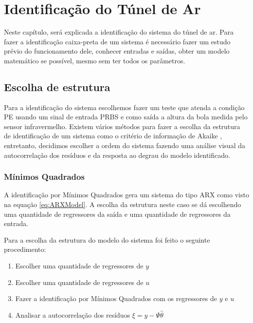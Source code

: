 \chapter{Identificação do Túnel de Ar} \label{cap4}

Neste capítulo, será explicada a identificação do sistema do túnel de ar. Para fazer a identificação caixa-preta de um sistema é necessário fazer um estudo prévio do funcionamento dele, conhecer entradas e saídas, obter um modelo matemático se possível, mesmo sem ter todos os parâmetros.
\section{Escolha de estrutura}
Para a identificação do sistema escolhemos fazer um teste que atenda a condição PE \cite{katayama2005} usando um sinal de entrada PRBS e como saída a altura da bola medida pelo sensor infravermelho. Existem vários métodos para fazer a escolha da estrutura de identificação de um sistema como o critério de informação de Akaike \cite{akaike1974}, entretanto, decidimos escolher a ordem do sistema fazendo uma análise visual da autocorrelação dos resíduos e da resposta ao degrau do modelo identificado.


\subsection{Mínimos Quadrados}\label{s:4mq}

A identificação por Mínimos Quadrados gera um sistema do tipo ARX como visto na equação \eqref{eq:ARXModel}. A escolha da estrutura neste caso se dá escolhendo uma quantidade de regressores da saída e uma quantidade de regressores da entrada. 


Para a escolha da estrutura do modelo do sistema foi feito o seguinte procedimento:
\begin{enumerate}
	\item Escolher uma quantidade de regressores de $y$
	\item Escolher uma quantidade de regressores de $u$
	\item Fazer a identificação por Mínimos Quadrados com os regressores de $y$ e $u$
	\item Analisar a autocorrelação dos resíduos $\xi=y-\Psi \hat{\theta}$
\end{enumerate}

